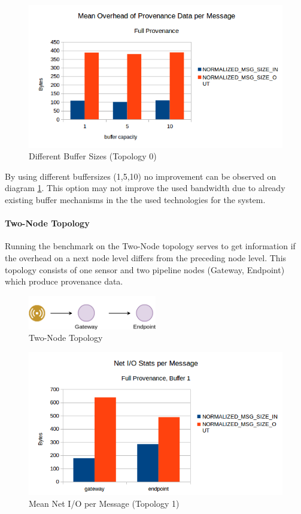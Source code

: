 \begin{figure}[H]
	\center
	\includegraphics[width=\textwidth]{figures/overheaddiagram2.png}
	\caption{Different Buffer Sizes (Topology 0)}
	\label{fig:buffersizes}
\end{figure}

By using different buffersizes (1,5,10) no improvement can be observed on diagram \ref{fig:buffersizes}. This option may not improve the used bandwidth due to already existing buffer mechanisms in the the used technologies for the system.


\paragraph*{Two-Node Topology}
Running the benchmark on the Two-Node topology serves to get information if the overhead on a next node level differs from the preceding node level. This topology consists of one sensor and two pipeline nodes (Gateway, Endpoint) which produce provenance data.

\begin{figure}[H]
	\center
	\includegraphics[width=0.5\textwidth]{figures/dataoverheadtopolabeled1.png}
	\caption{Two-Node Topology}
	\label{fig:topo1}
\end{figure}

\begin{figure}[H]
	\center
	\includegraphics[width=\textwidth]{figures/overheaddiagram3.png}
	\caption{Mean Net I/O per Message (Topology 1)}
	\label{fig:topo1meanpermsg}
\end{figure}



